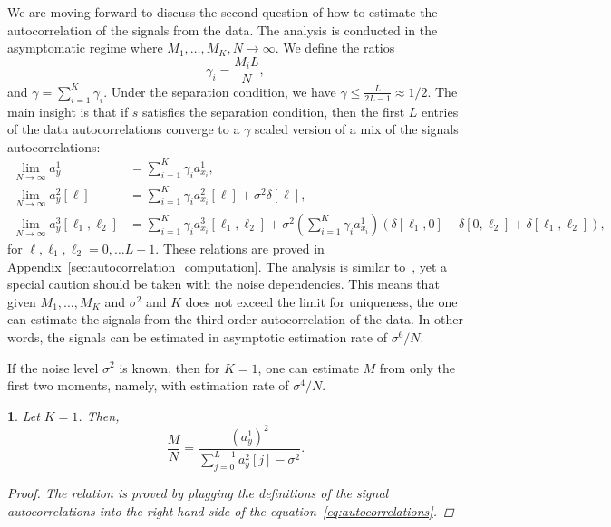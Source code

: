 \documentclass[english,11pt]{article}
\newcommand{\TODO}[1]{{\color{red}{[#1]}}}
\numberwithin{equation}{section}
\theoremstyle{plain}
\theoremstyle{definition}
\theoremstyle{remark}
\theoremstyle{plain}
\theoremstyle{remark}
\theoremstyle{plain}
\theoremstyle{plain}
\newtheorem{proposition}[thm]{\protect\propositionname}
\providecommand{\propositionname}{Proposition}
\begin{document}
\TODO{Where we should refer to Gianakis's paper?}

We are moving forward to discuss the second question of how to estimate the autocorrelation of the signals from the data. 
The analysis is conducted in the asymptomatic regime where $M_1,\ldots,M_K,N\to\infty$. We define the ratios 
\begin{equation}
\gamma_i = \frac{M_i L}{N},
\end{equation}
and $\gamma = \sum_{i=1}^K\gamma_i$.
Under the separation condition, we have $\gamma\leq\frac{L}{2L-1}\approx 1/2$.
The main insight is that if $s$ satisfies the separation condition, then the first $L$ entries of the data autocorrelations converge to a $\gamma$ scaled version of a mix of the signals autocorrelations:
\begin{align}
\lim_{N\to\infty} a_y^1 &= \sum_{i=1}^K\gamma_i a_{x_i}^1, \\
\lim_{N\to\infty} a_y^2[\ell] &= \sum_{i=1}^K\gamma_i a_{x_i}^2[\ell] +\sigma^2\delta[\ell],\\
\lim_{N\to\infty} a_y^3[\ell_1,\ell_2] &= \sum_{i=1}^K\gamma_i a_{x_i}^3[\ell_1,\ell_2] + \sigma^2\left(\sum_{i=1}^K\gamma_i a_{x_i}^1\right)(\delta[\ell_1,0]+\delta[0,\ell_2]+\delta[\ell_1,\ell_2]),
\end{align}
for $\ell,\ell_1,\ell_2=0,\ldots L-1$.
These relations are proved in Appendix~\ref{sec:autocorrelation_computation}. The analysis is similar to~\cite{bendory2017bispectrum,boumal2017heterogeneous}, yet a special caution should be taken with the noise dependencies. This means that given $M_1,\ldots,M_K$ and $\sigma^2$ and $K$ does not exceed the limit for uniqueness, the one can estimate the signals from the third-order autocorrelation of the data. In other words, the signals can be estimated in asymptotic estimation rate of $\sigma^6/N$.


If the noise level $\sigma^2$ is known, then for $K=1$, one can estimate $M$ from only the first two moments, namely, with estimation rate of $\sigma^4/N$.
\begin{proposition} \label{prop:gamma}
	Let $K=1$. Then, 
	\begin{equation*}
	\frac{M}{N} = \frac{(a^1_y)^2}{\sum_{j=0}^{L-1}a_y^2[j]-\sigma^2}.
	\end{equation*}
	\begin{proof}
The relation is proved by plugging the definitions of the signal autocorrelations into the right-hand side of the equation~\eqref{eq:autocorrelations}. 	
\end{proof}
\end{proposition}
\end{document}
